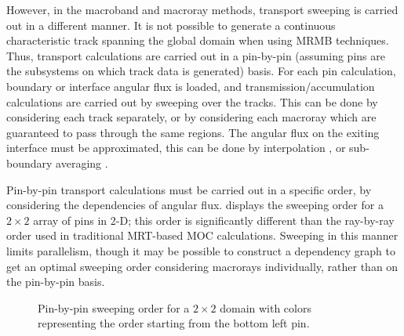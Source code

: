{{        However, in the macroband and macroray methods, transport sweeping is carried out in a different manner.
        It is not possible to generate a continuous characteristic track spanning the global domain when using \ac{MRMB} techniques.
        Thus, transport calculations are carried out in a pin-by-pin (assuming pins are the subsystems on which track data is generated) basis.
        For each pin calculation, boundary or interface angular flux is loaded, and transmission/accumulation calculations are carried out by sweeping over the tracks.
        This can be done by considering each track separately, or by considering each macroray which are guaranteed to pass through the same regions.
        The angular flux on the exiting interface must be approximated, this can be done by interpolation \cite{Yamamoto2005}, or sub-boundary averaging \cite{Liu2014}.

        Pin-by-pin transport calculations must be carried out in a specific order, by considering the dependencies of angular flux.
         displays the sweeping order for a $2\times2$ array of pins in 2-D; this order is significantly different than the ray-by-ray order used in traditional \ac{MRT}-based \ac{MOC} calculations.
        Sweeping in this manner limits parallelism, though it may be possible to construct a dependency graph to get an optimal sweeping order considering macrorays individually, rather than on the pin-by-pin basis.

        \begin{figure}[h]
            \centering
            \def\svgwidth{0.65\linewidth}
            
            \caption{Pin-by-pin sweeping order for a $2\times2$ domain with colors representing the order starting from the bottom left pin.}
            \label{fig:RT:Macroband Sweep Order}
        \end{figure}
    }
}